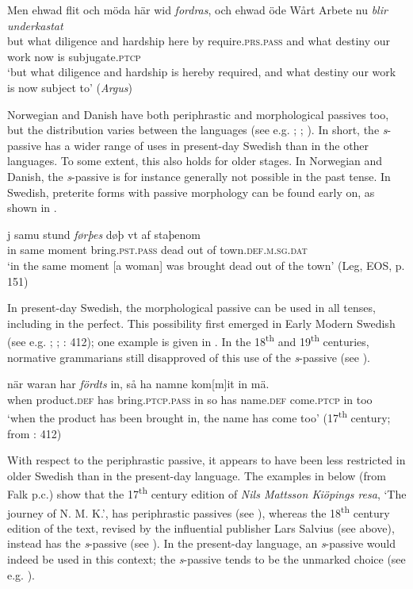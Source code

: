 \documentclass[output=paper]{langscibook}
\begin{document}
\ea\label{ex:intro:29}
\gll  Men  ehwad   flit         och   möda     här     wid \textit{fordras}, och ehwad öde   Wårt   Arbete nu \textit{blir} \textit{underkastat}\\
but   what   diligence and   hardship   here   by    require\textsc{.prs.pass} and what  destiny our     work   now   is     subjugate\textsc{.ptcp}\\
\glt ‘but what diligence and hardship is hereby required, and what destiny our work is now subject to’ (\textit{Argus})
\z

Norwegian and Danish have both periphrastic and morphological passives too, but the distribution varies between the languages (see e.g. \citealt{Engdahl2006}; \citealt{Laanemets2012}; \citealt{Faarlund2019}). In short, the \textit{s}{}-passive has a wider range of uses in present-day Swedish than in the other languages. To some extent, this also holds for older stages. In Norwegian and Danish, the \textit{s}{}-passive is for instance generally not possible in the past tense. In Swedish, preterite forms with passive morphology can be found early on, as shown in .


\ea\label{ex:intro:30}
\gll j     samu   stund \textit{førþes} døþ     vt     af staþenom\\
in   same     moment bring\textsc{.pst.pass}   dead     out   of town.\textsc{def.m.sg.dat}\\
\glt ‘in the same moment [a woman] was brought dead out of the town’ (Leg, EOS, p. 151)
\z


In present-day Swedish, the morphological passive can be used in all tenses, including in the perfect. This possibility first emerged in Early Modern Swedish (see e.g. \citealt{Holm1952}; \citealt{Platzack1989}; \citealt{Larsson2009}: 412); one example is given in . In the 18\textsuperscript{th} and 19\textsuperscript{th} centuries, normative grammarians still disapproved of this use of the \textit{s}{}-passive (see \citealt{Platzack1989}).


\ea\label{ex:intro:31}
\gll när     waran       har \textit{fördts} in, så ha   namne      kom[m]it in mä.\\
  when product\textsc{.def}  has bring.\textsc{ptcp.pass}     in  so has name\textsc{.def} come\textsc{.ptcp} in too\\
\glt ‘when the product has been brought in, the name has come too’ (17\textsuperscript{th} century; from \citealt{Larsson2009}: 412)
\z


With respect to the periphrastic passive, it appears to have been less restricted in older Swedish than in the present-day language. The examples in  below (from Falk p.c.) show that the 17\textsuperscript{th} century edition of \textit{Nils Mattsson Kiöpings resa}, ‘The journey of N. M. K.’, has periphrastic passives (see ), whereas the 18\textsuperscript{th} century edition of the text, revised by the influential publisher Lars Salvius (see  above), instead has the \textit{s}{}-passive (see ). In the present-day language, an \textit{s}{}-passive would indeed be used in this context; the \textit{s}{}-passive tends to be the unmarked choice (see e.g. \citealt{Engdahl2006}).
\end{document}
